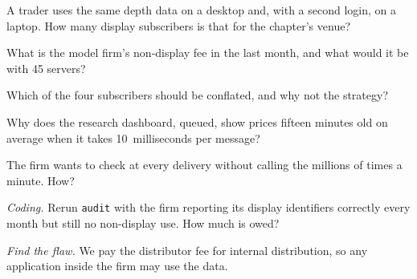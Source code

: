 \begin{exercise}[$\star$]\label{exo:pl:market-data-distribution-and-entitlements:2}
A trader uses the same depth data on a desktop and, with a second login, on a laptop. How many display subscribers is that for the chapter's
venue?
\end{exercise}

\begin{exercise}[$\star$]\label{exo:pl:market-data-distribution-and-entitlements:3}
What is the model firm's non-display fee in the last month, and what would it be with 45 servers?
\end{exercise}

\begin{exercise}[$\star\star$]\label{exo:pl:market-data-distribution-and-entitlements:4}
Which of the four subscribers should be conflated, and why not the strategy?
\end{exercise}

\begin{exercise}[$\star\star$]\label{exo:pl:market-data-distribution-and-entitlements:5}
Why does the research dashboard, queued, show prices fifteen minutes old on average when it takes 10~milliseconds per message?
\end{exercise}

\begin{exercise}[$\star\star$]\label{exo:pl:market-data-distribution-and-entitlements:6}
The firm wants to check  at every delivery without calling the  millions of times a minute. How?
\end{exercise}

\begin{exercise}[$\star\star\star$]\label{exo:pl:market-data-distribution-and-entitlements:7}
\emph{Coding.} Rerun \texttt{audit} with the firm reporting its display identifiers correctly every month but still no non-display use. How
much is owed?
\end{exercise}

\begin{exercise}[$\star\star\star$]\label{exo:pl:market-data-distribution-and-entitlements:8}
\emph{Find the flaw.} \textquotedbl{}We pay the distributor fee for internal distribution, so any application inside the firm may use the
data.\textquotedbl{}
\end{exercise}

